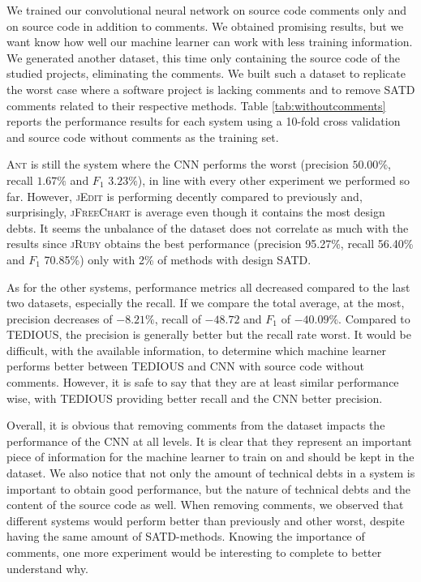 We trained our convolutional neural network on source code comments only and on source code in addition to comments. We obtained promising results, but we want know how well our machine learner can work with less training information. We generated another dataset, this time only containing the source code of the studied projects, eliminating the comments. We built such a dataset to replicate the worst case where a software project is lacking comments and to remove SATD comments related to their respective methods. Table \ref{tab:withoutcomments} reports the performance results for each system using a 10-fold cross validation and source code without comments as the training set.

\textsc{Ant} is still the system where the CNN performs the worst (precision $50.00\%$, recall $1.67\%$ and $F_1$ $3.23\%$), in line with every other experiment we performed so far. However, \textsc{jEdit} is performing decently compared to previously and, surprisingly, \textsc{jFreeChart} is average even though it contains the most design debts. It seems the unbalance of the dataset does not correlate as much with the results since \textsc{jRuby} obtains the best performance (precision 95.27\%, recall 56.40\% and $F_1$ 70.85\%) only with 2\% of methods with design SATD.

As for the other systems, performance metrics all decreased compared to the last two datasets, especially the recall. If we compare the total average, at the most, precision decreases of $- 8.21\%$, recall of $-48.72$ and $F_1$ of $-40.09\%$. Compared to TEDIOUS, the precision is generally better but the recall rate worst. It would be difficult, with the available information, to determine which machine learner performs better between TEDIOUS and CNN with source code without comments. However, it is safe to say that they are at least similar performance wise, with TEDIOUS providing better recall and the CNN better precision.

Overall, it is obvious that removing comments from the dataset impacts the performance of the CNN at all levels. It is clear that they represent an important piece of information for the machine learner to train on and should be kept in the dataset. We also notice that not only the amount of technical debts in a system is important to obtain good performance, but the nature of technical debts and the content of the source code as well. When removing comments, we observed that different systems would perform better than previously and other worst, despite having the same amount of SATD-methods. Knowing the importance of comments, one more experiment would be interesting to complete to better understand why.

